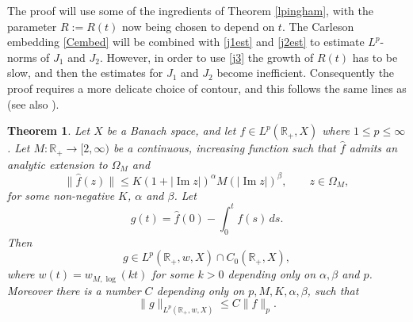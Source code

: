 \documentclass[11pt]{amsart}
\newtheorem{theorem}{Theorem}[section]
\theoremstyle{definition}
\theoremstyle{remark}
\numberwithin{equation}{section}
\begin{document}
The proof will use some of the ingredients of Theorem \ref{lpingham}, with the parameter $R := R(t)$ now being chosen to depend on $t$.  The Carleson embedding \eqref{Cembed} will be combined with \eqref{j1est} and \eqref{j2est} to estimate $L^p$-norms of $J_1$ and $J_2$.  However, in order to use \eqref{j3} the growth of $R(t)$  has to be slow, and then the estimates for $J_1$ and $J_2$ become inefficient.  Consequently the proof requires a more delicate choice of contour, and this follows the same lines as \cite{BaDu} (see also \cite[Theorem 4.4.14]{ABHN01}).

\begin{theorem}\label{x1} Let $X$ be a Banach space, and
let  $f \in L^p(\mathbb R_+, X)$ where $1\le p\le\infty$. Let $M : {{\mathbb R}}_+ \to [2,\infty)$ be a continuous, increasing function such that $\widehat f$ admits an analytic extension to $\Omega_M$ and
\begin{equation}\label{omega}
\|\widehat f (z)\| \le K (1 + |{\operatorname{Im}} z|)^\alpha M(|{\operatorname{Im}} z|)^{\beta}, \qquad z\in \Omega_M,
\end{equation}
for some non-negative $K$, $\alpha$ and $\beta$.  Let
$$
g(t)=\widehat f(0) -\int_{0}^{t} f(s) \, ds.
$$
Then
\begin{equation*}
g \in L^p({{\mathbb R}}_+,w,X) \cap C_0({{\mathbb R}}_+,X),
\end{equation*}
where $w(t) = {w_{M,{\log}}}(kt)$ for some $k>0$ depending only on $\alpha,\beta$ and $p$.  Moreover there is a number $C$ depending only on $p,M,K,\alpha,\beta$, such that
\begin{equation} \label{lprate}
\|g\|_{L^p({{\mathbb R}}_+,w,X)} \le C\|f\|_p.
\end{equation}
\end{theorem}
\end{document}
